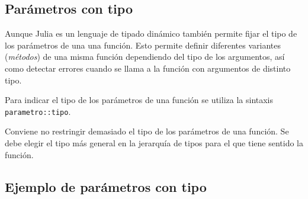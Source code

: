 \documentclass[
  letterpaper,
  DIV=11,
  numbers=noendperiod]{scrreprt}
\begin{document}
\hypertarget{paruxe1metros-con-tipo}{%
\subsection{Parámetros con tipo}\label{paruxe1metros-con-tipo}}

Aunque Julia es un lenguaje de tipado dinámico también permite fijar el
tipo de los parámetros de una una función. Esto permite definir
diferentes variantes (\emph{métodos}) de una misma función dependiendo
del tipo de los argumentos, así como detectar errores cuando se llama a
la función con argumentos de distinto tipo.

Para indicar el tipo de los parámetros de una función se utiliza la
sintaxis \texttt{parametro::tipo}.

\begin{tcolorbox}[enhanced jigsaw, colbacktitle=quarto-callout-warning-color!10!white, coltitle=black, opacityback=0, opacitybacktitle=0.6, bottomtitle=1mm, leftrule=.75mm, toprule=.15mm, bottomrule=.15mm, toptitle=1mm, breakable, colframe=quarto-callout-warning-color-frame, colback=white, rightrule=.15mm, titlerule=0mm, title=\textcolor{quarto-callout-warning-color}{\faExclamationTriangle}\hspace{0.5em}{Warning}, arc=.35mm, left=2mm]
Conviene no restringir demasiado el tipo de los parámetros de una
función. Se debe elegir el tipo más general en la jerarquía de tipos
para el que tiene sentido la función.
\end{tcolorbox}

\hypertarget{ejemplo-de-paruxe1metros-con-tipo}{%
\subsection{Ejemplo de parámetros con
tipo}\label{ejemplo-de-paruxe1metros-con-tipo}}
\end{document}
